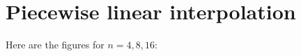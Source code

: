 \documentclass{article}
\begin{document}
	
	\section*{Piecewise linear interpolation}
	
	Here are the figures for $n=4,8,16$:
	
	
	
\end{document}
